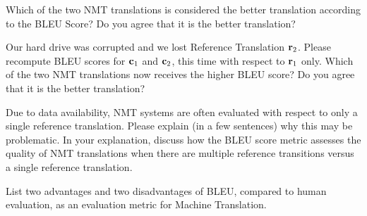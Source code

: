 \begin{parts}
\begin{subparts}
        Which of the two NMT translations is considered the better translation according to the BLEU Score? Do you agree that it is the better translation?

        \subpart[5] Our hard drive was corrupted and we lost Reference Translation $\mathbf{r}_2$. Please recompute BLEU scores for $\mathbf{c}_1$ and $\mathbf{c}_2$, this time with respect to $\mathbf{r}_1$ only. Which of the two NMT translations now receives the higher BLEU score? Do you agree that it is the better translation?

        \subpart[2] Due to data availability, NMT systems are often evaluated with respect to only a single reference translation. Please explain (in a few sentences) why this may be problematic. In your explanation, discuss how the BLEU score metric assesses the quality of NMT translations when there are multiple reference transitions versus a single reference translation.

        \subpart[2] List two advantages and two disadvantages of BLEU, compared to human evaluation, as an evaluation metric for Machine Translation.
    \end{subparts}
\end{parts}
